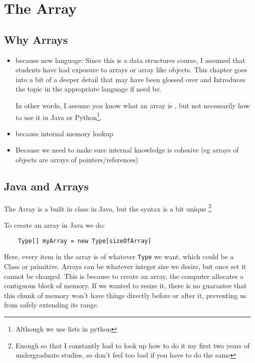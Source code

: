 \chapter{The Array}

\section{Why Arrays}

\begin{itemize}
	\item because new language: 
	Since this is a data structures course, I assumed that students have had exposure to arrays or array like objects.
	This chapter goes into a bit of a deeper detail that may have been glossed over and Introduces the topic in the appropriate language if need be.
	
	In other words, I assume you know what an array is , but not necessarily how to use it in Java or Python\footnote{Although we use lists in python}.
	\item  because internal memory lookup
	\item Because we need to make sure internal knowledge is cohesive (eg arrays of objects are arrays of pointers/references)
\end{itemize}







\section{Java and Arrays}
The Array is a built in class in Java, but the syntax is a bit unique \footnote{Enough so that I constantly had to look up how to do it my first two years of undergraduate studies, so don't feel too bad if you have to do the same}

To create an array in Java we do:

\begin{verbatim}
	Type[] myArray = new Type[sizeOfArray]
\end{verbatim}


Here, every item in the array is of whatever \texttt{Type} we want, which could be a Class or primitive.   
Arrays can be whatever integer size we desire, but once set it cannot be changed.
This is because to create an array, the computer allocates a contiguous block of memory.
If we wanted to resize it, there is no guarantee that this chunk of memory won't have things directly before or after it, preventing us from safely extending its range.

